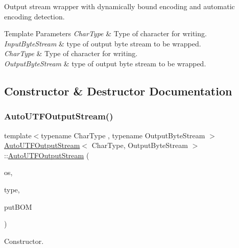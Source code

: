 Output stream wrapper with dynamically bound encoding and automatic encoding detection. 


\begin{DoxyTemplParams}{Template Parameters}
{\em Char\+Type} & Type of character for writing. \\
\hline
{\em Input\+Byte\+Stream} & type of output byte stream to be wrapped.\\
\hline
{\em Char\+Type} & Type of character for writing. \\
\hline
{\em Output\+Byte\+Stream} & type of output byte stream to be wrapped. \\
\hline
\end{DoxyTemplParams}


\subsection{Constructor \& Destructor Documentation}
\mbox{\label{classAutoUTFOutputStream_a2fe7dbc8e43d11295f66df5653148137}} 
\subsubsection{\texorpdfstring{Auto\+U\+T\+F\+Output\+Stream()}{AutoUTFOutputStream()}\hspace{0.1cm}{\footnotesize\ttfamily [1/2]}}
{\footnotesize\ttfamily template$<$typename Char\+Type , typename Output\+Byte\+Stream $>$ \\
\hyperlink{classAutoUTFOutputStream}{Auto\+U\+T\+F\+Output\+Stream}$<$ Char\+Type, Output\+Byte\+Stream $>$\+::\hyperlink{classAutoUTFOutputStream}{Auto\+U\+T\+F\+Output\+Stream} (\begin{DoxyParamCaption}\item[{Output\+Byte\+Stream \&}]{os,  }\item[{U\+T\+F\+Type}]{type,  }\item[{bool}]{put\+B\+OM }\end{DoxyParamCaption})\hspace{0.3cm}{\ttfamily [inline]}}



Constructor. 


